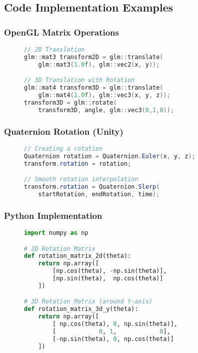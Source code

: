 \documentclass[12pt]{article}
\begin{document}
\subsection{Code Implementation Examples}

\subsubsection{OpenGL Matrix Operations}
\begin{figure}[H]
\begin{minipage}{\linewidth}
\begin{lstlisting}[language=C++, caption=OpenGL Matrix Transformations]
// 2D Translation
glm::mat3 transform2D = glm::translate(
    glm::mat3(1.0f), glm::vec2(x, y));

// 3D Translation with Rotation
glm::mat4 transform3D = glm::translate(
    glm::mat4(1.0f), glm::vec3(x, y, z));
transform3D = glm::rotate(
    transform3D, angle, glm::vec3(0,1,0));
\end{lstlisting}
\end{minipage}
\end{figure}

\subsubsection{Quaternion Rotation (Unity)}
\begin{figure}[H]
\begin{minipage}{\linewidth}
\begin{lstlisting}[language=csharp, caption=Unity Quaternion Operations]
// Creating a rotation
Quaternion rotation = Quaternion.Euler(x, y, z);
transform.rotation = rotation;

// Smooth rotation interpolation
transform.rotation = Quaternion.Slerp(
    startRotation, endRotation, time);
\end{lstlisting}
\end{minipage}
\end{figure}

\subsubsection{Python Implementation}
\begin{figure}[H]
\begin{minipage}{\linewidth}
\begin{lstlisting}[language=Python, caption=Python Matrix Operations]
import numpy as np

# 2D Rotation Matrix
def rotation_matrix_2d(theta):
    return np.array([
        [np.cos(theta), -np.sin(theta)],
        [np.sin(theta),  np.cos(theta)]
    ])

# 3D Rotation Matrix (around Y-axis)
def rotation_matrix_3d_y(theta):
    return np.array([
        [ np.cos(theta), 0, np.sin(theta)],
        [            0, 1,            0],
        [-np.sin(theta), 0, np.cos(theta)]
    ])
\end{lstlisting}
\end{minipage}
\end{figure}
\end{document}
